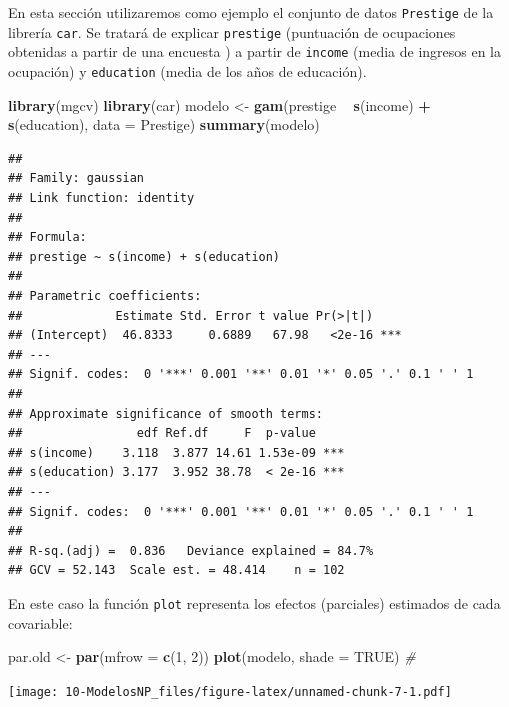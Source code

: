 \documentclass[]{book}
\newenvironment{Shaded}{\begin{snugshade}}{\end{snugshade}}
\newcommand{\KeywordTok}[1]{\textcolor[rgb]{0.13,0.29,0.53}{\textbf{#1}}}
\newcommand{\DataTypeTok}[1]{\textcolor[rgb]{0.13,0.29,0.53}{#1}}
\newcommand{\DecValTok}[1]{\textcolor[rgb]{0.00,0.00,0.81}{#1}}
\newcommand{\StringTok}[1]{\textcolor[rgb]{0.31,0.60,0.02}{#1}}
\newcommand{\CommentTok}[1]{\textcolor[rgb]{0.56,0.35,0.01}{\textit{#1}}}
\newcommand{\OtherTok}[1]{\textcolor[rgb]{0.56,0.35,0.01}{#1}}
\newcommand{\OperatorTok}[1]{\textcolor[rgb]{0.81,0.36,0.00}{\textbf{#1}}}
\newcommand{\NormalTok}[1]{#1}
\begin{document}
En esta sección utilizaremos como ejemplo el conjunto de datos
\texttt{Prestige} de la librería \texttt{car}. Se tratará de explicar
\texttt{prestige} (puntuación de ocupaciones obtenidas a partir de una
encuesta ) a partir de \texttt{income} (media de ingresos en la
ocupación) y \texttt{education} (media de los años de educación).

\begin{Shaded}
\begin{Highlighting}[]
\KeywordTok{library}\NormalTok{(mgcv)}
\KeywordTok{library}\NormalTok{(car)}
\NormalTok{modelo <-}\StringTok{ }\KeywordTok{gam}\NormalTok{(prestige }\OperatorTok{~}\StringTok{ }\KeywordTok{s}\NormalTok{(income) }\OperatorTok{+}\StringTok{ }\KeywordTok{s}\NormalTok{(education), }\DataTypeTok{data =}\NormalTok{ Prestige)}
\KeywordTok{summary}\NormalTok{(modelo)}
\end{Highlighting}
\end{Shaded}

\begin{verbatim}
## 
## Family: gaussian 
## Link function: identity 
## 
## Formula:
## prestige ~ s(income) + s(education)
## 
## Parametric coefficients:
##             Estimate Std. Error t value Pr(>|t|)    
## (Intercept)  46.8333     0.6889   67.98   <2e-16 ***
## ---
## Signif. codes:  0 '***' 0.001 '**' 0.01 '*' 0.05 '.' 0.1 ' ' 1
## 
## Approximate significance of smooth terms:
##                edf Ref.df     F  p-value    
## s(income)    3.118  3.877 14.61 1.53e-09 ***
## s(education) 3.177  3.952 38.78  < 2e-16 ***
## ---
## Signif. codes:  0 '***' 0.001 '**' 0.01 '*' 0.05 '.' 0.1 ' ' 1
## 
## R-sq.(adj) =  0.836   Deviance explained = 84.7%
## GCV = 52.143  Scale est. = 48.414    n = 102
\end{verbatim}

En este caso la función \texttt{plot} representa los efectos (parciales)
estimados de cada covariable:

\begin{Shaded}
\begin{Highlighting}[]
\NormalTok{par.old <-}\StringTok{ }\KeywordTok{par}\NormalTok{(}\DataTypeTok{mfrow =} \KeywordTok{c}\NormalTok{(}\DecValTok{1}\NormalTok{, }\DecValTok{2}\NormalTok{))}
\KeywordTok{plot}\NormalTok{(modelo, }\DataTypeTok{shade =} \OtherTok{TRUE}\NormalTok{) }\CommentTok{# }
\end{Highlighting}
\end{Shaded}

\texttt{[image: 10-ModelosNP\_files/figure-latex/unnamed-chunk-7-1.pdf]}
\end{document}
